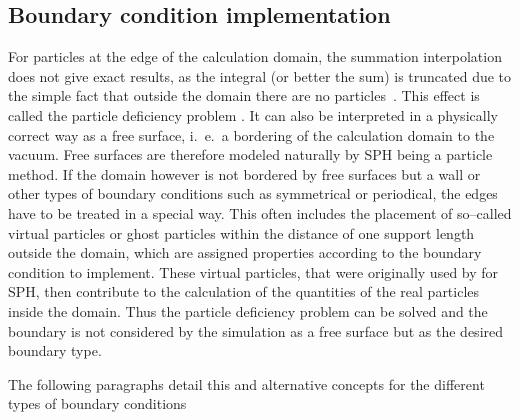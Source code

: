 \documentclass[11pt,a4paper,twoside]{report}
\begin{document}
\subsection{Boundary condition implementation}
\label{sec:boundaryConditionImplementation}
For particles at the edge of the calculation domain, the summation interpolation does not
give exact results, as the integral (or better the sum) is truncated due to
the simple fact that outside the domain there are no
particles~\cite{Liu2003}. This effect is called the particle deficiency problem \cite{Liu2003}. %
It can also be interpreted in a physically correct way %
as a free surface, i.\ e.\ a bordering of the calculation domain to the vacuum. Free surfaces are therefore modeled naturally by SPH being a particle method. If the domain however is not bordered by free surfaces but a wall or other types of boundary conditions such as symmetrical or periodical, the edges have to be treated in a special way. This often includes the placement of so--called virtual particles or ghost particles within the distance of one support length outside the domain, which are assigned properties according to the boundary condition to implement. These virtual particles, that were originally used by \cite{Libersky1993} for SPH, then contribute to the calculation of the quantities of the real particles inside the domain. Thus the particle deficiency problem can be solved and the boundary is not considered by the simulation as a free surface but as the desired boundary type. 

The following paragraphs detail this and alternative concepts for the different types of boundary conditions
\end{document}
